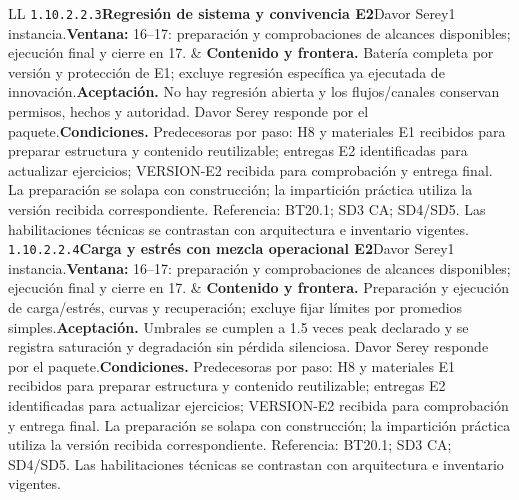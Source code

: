 \begin{longtable}{L{\tabcolsep\relax}L{\tabcolsep\relax}}
\texttt{1.\allowbreak{}10.\allowbreak{}2.\allowbreak{}2.\allowbreak{}3}\newline{}\textbf{Regresión de sistema y convivencia E2}\newline{}Davor Serey\newline{}1 instancia.\newline{}\textbf{Ventana:} 16--17: preparación y comprobaciones de alcances disponibles; ejecución final y cierre en 17. & \textbf{Contenido y frontera.} Batería completa por versión y protección de E1; excluye regresión específica ya ejecutada de innovación.\newline{}\textbf{Aceptación.} No hay regresión abierta y los flujos/canales conservan permisos, hechos y autoridad. Davor Serey responde por el paquete.\newline{}\textbf{Condiciones.} Predecesoras por paso: H8 y materiales E1 recibidos para preparar estructura y contenido reutilizable; entregas E2 identificadas para actualizar ejercicios; VERSION-E2 recibida para comprobación y entrega final. La preparación se solapa con construcción; la impartición práctica utiliza la versión recibida correspondiente. Referencia: BT20.1; SD3 CA; SD4/SD5. Las habilitaciones técnicas se contrastan con arquitectura e inventario vigentes.\\\hline
\texttt{1.\allowbreak{}10.\allowbreak{}2.\allowbreak{}2.\allowbreak{}4}\newline{}\textbf{Carga y estrés con mezcla operacional E2}\newline{}Davor Serey\newline{}1 instancia.\newline{}\textbf{Ventana:} 16--17: preparación y comprobaciones de alcances disponibles; ejecución final y cierre en 17. & \textbf{Contenido y frontera.} Preparación y ejecución de carga/estrés, curvas y recuperación; excluye fijar límites por promedios simples.\newline{}\textbf{Aceptación.} Umbrales se cumplen a 1.5 veces peak declarado y se registra saturación y degradación sin pérdida silenciosa. Davor Serey responde por el paquete.\newline{}\textbf{Condiciones.} Predecesoras por paso: H8 y materiales E1 recibidos para preparar estructura y contenido reutilizable; entregas E2 identificadas para actualizar ejercicios; VERSION-E2 recibida para comprobación y entrega final. La preparación se solapa con construcción; la impartición práctica utiliza la versión recibida correspondiente. Referencia: BT20.1; SD3 CA; SD4/SD5. Las habilitaciones técnicas se contrastan con arquitectura e inventario vigentes.\\\hline

\end{longtable}
